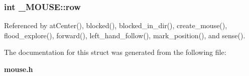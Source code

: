\subsubsection[{row}]{\setlength{\rightskip}{0pt plus 5cm}int \-\_\-\-M\-O\-U\-S\-E\-::row}\label{struct__MOUSE_aae94539440c5448fbda17b54fd6119ac}


Referenced by at\-Center(), blocked(), blocked\-\_\-in\-\_\-dir(), create\-\_\-mouse(), flood\-\_\-explore(), forward(), left\-\_\-hand\-\_\-follow(), mark\-\_\-position(), and sense().



The documentation for this struct was generated from the following file\-:\begin{DoxyCompactItemize}
\item 
{\bf mouse.\-h}\end{DoxyCompactItemize}

